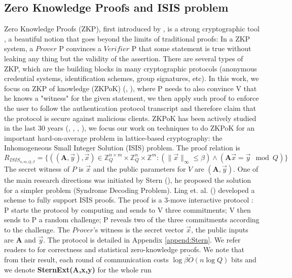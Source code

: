 \subsection{Zero Knowledge Proofs and ISIS problem}
\label{sec:zkpisis}
Zero Knowledge Proofs (ZKP), first introduced by \cite{goldwasser1989knowledge},
is a strong cryptographic tool , a beautiful notion that goes beyond the limits
of traditional proofs: In a ZKP system, a $Prover$ P convinces a $Verifier$ P
that some statement is true without leaking any thing but the validity of the
assertion. There are several types of ZKP, which are the building blocks in many
cryptographic protocols (anonymous credential systems, identification schemes,
group signatures, etc). In this work, we focus on ZKP of knowledge (ZKPoK)
(\cite{bellare1992defining}, \cite{goldwasser1989knowledge}), where P needs to
also convince V that he knows a "witness" for the given statement, we then apply
such proof to enforce the user to follow the authentication protocol transcript
and therefore claim that the protocol is secure against malicious clients.
ZKPoK has been actively studied in the last 30 years (\cite{feige1988zero},
\cite{rackoff1991non}, \cite{micciancio2003statistical},
\cite{ling2013improved}), we focus our work on techniques to do ZKPoK for an
important hard-on-average problem in lattice-based cryptography: the
Inhomogeneous Small Integer Solution (ISIS) problem. The proof relation is
\[ R_{ISIS_{n,m,Q,\beta}} = \{ ((\mathbf{A},\vec{y}),\vec{x}) \in
  \mathbb{Z}_Q^{n\times m} \times \mathbb{Z}_Q^n \times \mathbb{Z}^m:
  (\|\vec{x}\|_\infty \leq \beta) \land (\mathbf{A}\vec{x} = \vec{y} \mod Q) \}
\]
The secret witness of \(P\) is \(\vec{x}\) and the public parameters for \(V\)
are \((\mathbf{A},\vec{y})\).  One of the main research directions was initiated
by Stern (\cite{stern1993new}), he proposed the solution for a simpler problem
(Syndrome Decoding Problem).  Ling et. al. (\cite{ling2013improved}) developed a
scheme to fully support ISIS proofs. The proof is a 3-move interactive protocol
: P starts the protocol by computing and sends to V three commitments; V then
sends to P a random challenge; P reveals two of the three commitments according
to the challenge. The $Prover$'s witness is the secret vector $\vec{x}$, the
public inputs are $\mathbf{A}$ and $\vec{y}$. The protocol is detailed in
Appendix \ref{append:Stern}. We refer readers to \cite{ling2013improved} for
correctness and statistical zero-knowledge proofs. We note that from their
result, each round of communication costs $\log\beta\tilde{O}(n \log Q)$ bits
and we denote \textbf{SternExt(A,x,y)} for the whole run


